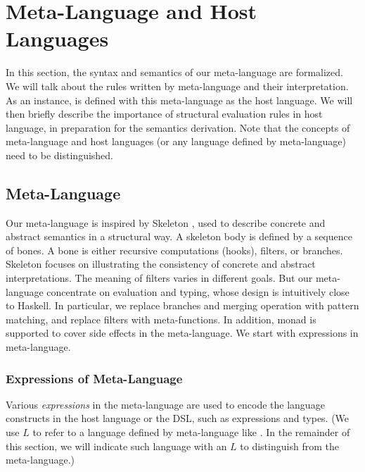 \section{Meta-Language and Host Languages}\label{sec:host}

In this section, the syntax and semantics of our meta-language are formalized.
We will talk about the rules written by meta-language and their interpretation.
As an instance, \STLC{} is defined with this meta-language as the host language.
We will then briefly describe the importance of structural evaluation rules in host language,
 in preparation for the semantics derivation.
Note that the concepts of meta-language and host languages (or any language defined by meta-language) need to be distinguished.

\subsection{Meta-Language}\label{sec:meta}

Our meta-language is inspired by Skeleton \cite{skeleton}, 
 used to describe concrete and abstract semantics in a structural way.
A skeleton body is defined by a sequence of bones.
A bone is either recursive computations (hooks), filters, or branches.
Skeleton focuses on illustrating the consistency of concrete and abstract interpretations.
The meaning of filters varies in different goals.
But our meta-language concentrate on evaluation and typing,
 whose design is intuitively close to Haskell.
In particular, we replace branches and merging operation with pattern matching,
 and replace filters with meta-functions.
In addition, monad is supported to cover side effects in the meta-language. %
We start with expressions in meta-language.

\subsubsection{Expressions of Meta-Language}
Various \textit{expressions} in the meta-language are used to encode the language constructs in the host language or the DSL, such as expressions and types.
(We use $L$ to refer to a language defined by meta-language like \STLC.
In the remainder of this section, we will indicate such language with an $L$ to distinguish from the meta-language.)

